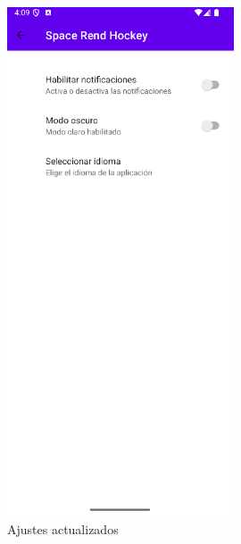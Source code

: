 \documentclass[a4paper,openright,12pt]{article}
\begin{document}
\begin{figure}[htp]
\begin{minipage}{0.3\textwidth}
        \includegraphics[width=0.6\textwidth]{Images/Vista_It4_5.png} 
        \caption{Ajustes actualizados}
        \label{fig:ajustes actualizado}
    \end{minipage}
\end{figure}
\end{document}

